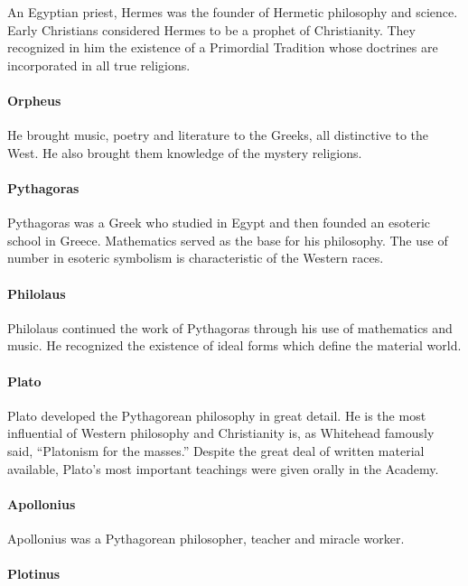 An Egyptian priest, Hermes was the founder of Hermetic philosophy and science. Early Christians considered Hermes to be a prophet of Christianity. They recognized in him the existence of a Primordial Tradition whose doctrines are incorporated in all true religions.

\paragraph{Orpheus}


He brought music, poetry and literature to the Greeks, all distinctive to the West. He also brought them knowledge of the mystery religions.

\paragraph{Pythagoras}


Pythagoras was a Greek who studied in Egypt and then founded an esoteric school in Greece. Mathematics served as the base for his philosophy. The use of number in esoteric symbolism is characteristic of the Western races.

\paragraph{Philolaus}


Philolaus continued the work of Pythagoras through his use of mathematics and music. He recognized the existence of ideal forms which define the material world.

\paragraph{Plato}


Plato developed the Pythagorean philosophy in great detail. He is the most influential of Western philosophy and Christianity is, as Whitehead famously said, ``Platonism for the masses.'' Despite the great deal of written material available, Plato's most important teachings were given orally in the Academy.

\paragraph{Apollonius}


Apollonius was a Pythagorean philosopher, teacher and miracle worker.

\paragraph{Plotinus}


